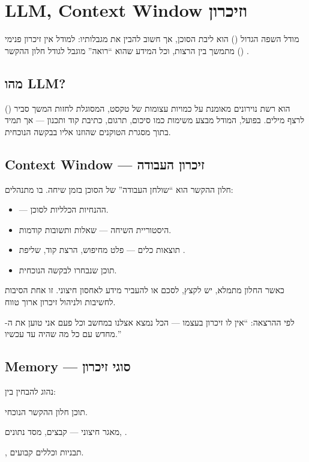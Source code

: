 \section{LLM, Context Window וזיכרון}

מודל השפה הגדול () הוא ליבת הסוכן, אך חשוב להבין את מגבלותיו:
למודל אין זיכרון פנימי מתמשך בין הרצות, וכל המידע שהוא ``רואה'' מוגבל
לגודל חלון ההקשר () \cite{brown2020gpt3}.

\subsection{מהו LLM?}

 () הוא רשת נוירונים מאומנת על כמויות
עצומות של טקסט, המסוגלת לחזות המשך סביר לרצף מילים. בפועל, המודל מבצע
משימות כמו סיכום, תרגום, כתיבת קוד ותכנון --- אך תמיד בתוך מסגרת
הטוקנים שהוזנו אליו בבקשה הנוכחית.

\subsection{Context Window --- זיכרון העבודה}

חלון ההקשר הוא ``שולחן העבודה'' של הסוכן בזמן שיחה. בו מתנהלים:
\begin{itemize}[rightmargin=2em]
  \item {} --- ההנחיות הכלליות לסוכן.
  \item היסטוריית השיחה --- שאלות ותשובות קודמות.
  \item תוצאות כלים --- פלט מחיפוש, הרצת קוד, שליפת .
  \item תוכן  שנבחרו לבקשה הנוכחית.
\end{itemize}

כאשר החלון מתמלא, יש לקצץ, לסכם או להעביר מידע לאחסון חיצוני. זו אחת
הסיבות לחשיבות  ולניהול זיכרון ארוך טווח.

\begin{notebox}
לפי ההרצאה: ``אין לו זיכרון בעצמו --- הכל נמצא אצלנו במחשב וכל פעם
אני טוען את ה- מחדש עם כל מה שהיה עד עכשיו.''
\end{notebox}

\subsection{Memory --- סוגי זיכרון}

נהוג להבחין בין:
\begin{description}[rightmargin=2em, style=nextline]
  \item[זיכרון קצר טווח] תוכן חלון ההקשר הנוכחי.
  \item[זיכרון ארוך טווח] מאגר חיצוני --- קבצים, מסד נתונים, .
  \item[זיכרון פרוצדורלי] , תבניות  וכללים קבועים.
\end{description}

